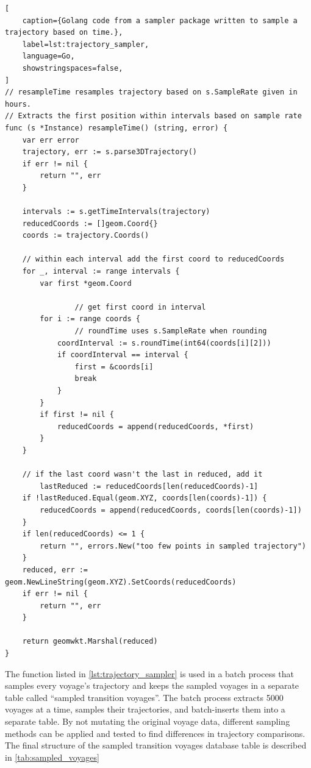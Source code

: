 \begin{lstlisting}[
    caption={Golang code from a sampler package written to sample a trajectory based on time.},
    label=lst:trajectory_sampler,
    language=Go,
    showstringspaces=false,
]
// resampleTime resamples trajectory based on s.SampleRate given in hours.
// Extracts the first position within intervals based on sample rate
func (s *Instance) resampleTime() (string, error) {
	var err error
	trajectory, err := s.parse3DTrajectory()
	if err != nil {
		return "", err
	}

	intervals := s.getTimeIntervals(trajectory)
	reducedCoords := []geom.Coord{}
	coords := trajectory.Coords()

	// within each interval add the first coord to reducedCoords
	for _, interval := range intervals {
		var first *geom.Coord

                // get first coord in interval
		for i := range coords {
		        // roundTime uses s.SampleRate when rounding
			coordInterval := s.roundTime(int64(coords[i][2]))
			if coordInterval == interval {
				first = &coords[i]
				break
			}
		}
		if first != nil {
			reducedCoords = append(reducedCoords, *first)
		}
	}

	// if the last coord wasn't the last in reduced, add it
        lastReduced := reducedCoords[len(reducedCoords)-1]
	if !lastReduced.Equal(geom.XYZ, coords[len(coords)-1]) {
		reducedCoords = append(reducedCoords, coords[len(coords)-1])
	}
	if len(reducedCoords) <= 1 {
		return "", errors.New("too few points in sampled trajectory")
	}
	reduced, err := geom.NewLineString(geom.XYZ).SetCoords(reducedCoords)
	if err != nil {
		return "", err
	}

	return geomwkt.Marshal(reduced)
}
\end{lstlisting}

The function listed in \cref{lst:trajectory_sampler} is used in a batch process that samples every voyage's trajectory and keeps the sampled voyages in a separate table called ``sampled transition voyages''. The batch process extracts 5000 voyages at a time, samples their trajectories, and batch-inserts them into a separate table. By not mutating the original voyage data, different sampling methods can be applied and tested to find differences in trajectory comparisons. The final structure of the sampled transition voyages database table is described in \cref{tab:sampled_voyages}

